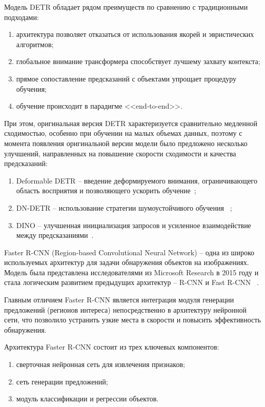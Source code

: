 Модель DETR обладает рядом преимуществ по сравнению с традиционными подходами:

\begin{enumerate}
    \item архитектура позволяет отказаться от использования якорей и 
    эвристических алгоритмов;
    \item глобальное внимание трансформера способствует лучшему захвату 
    контекста;
    \item прямое сопоставление предсказаний с объектами упрощает процедуру 
    обучения;
    \item обучение происходит в парадигме <<end-to-end>>.
\end{enumerate}

При этом, оригинальная версия DETR характеризуется сравнительно медленной 
сходимостью, особенно при обучении на малых объемах данных, поэтому с момента 
появления оригинальной версии модели было предложено несколько улучшений, 
направленных на повышение скорости сходимости и качества предсказаний:

\begin{enumerate}
    \item Deformable DETR -- введение деформируемого внимания, ограничивающего 
    область восприятия и позволяющего ускорить обучение~\cite{deformabledetr};
    \item DN-DETR -- использование стратегии шумоустойчивого обучения
    ~\cite{dn-detr};
    \item DINO -- улучшенная инициализация запросов и усиленное взаимодействие 
    между предсказаниями~\cite{dino}.
\end{enumerate}

Faster R-CNN (Region-based Convolutional Neural Network) -- одна из широко 
используемых архитектур для задачи обнаружения объектов на изображениях. Модель 
была представлена исследователями из Microsoft Research в 2015 году и стала 
логическим развитием предыдущих архитектур -- R-CNN и Fast R-CNN
~\cite{fasterrcnn}.

Главным отличием Faster R-CNN является интеграция модуля генерации предложений 
(регионов интереса) непосредственно в архитектуру нейронной сети, что позволило 
устранить узкие места в скорости и повысить эффективность обнаружения.

Архитектура Faster R-CNN состоит из трех ключевых компонентов:

\begin{enumerate}
    \item сверточная нейронная сеть для извлечения признаков;
    \item сеть генерации предложений;
    \item модуль классификации и регрессии объектов.
\end{enumerate}

